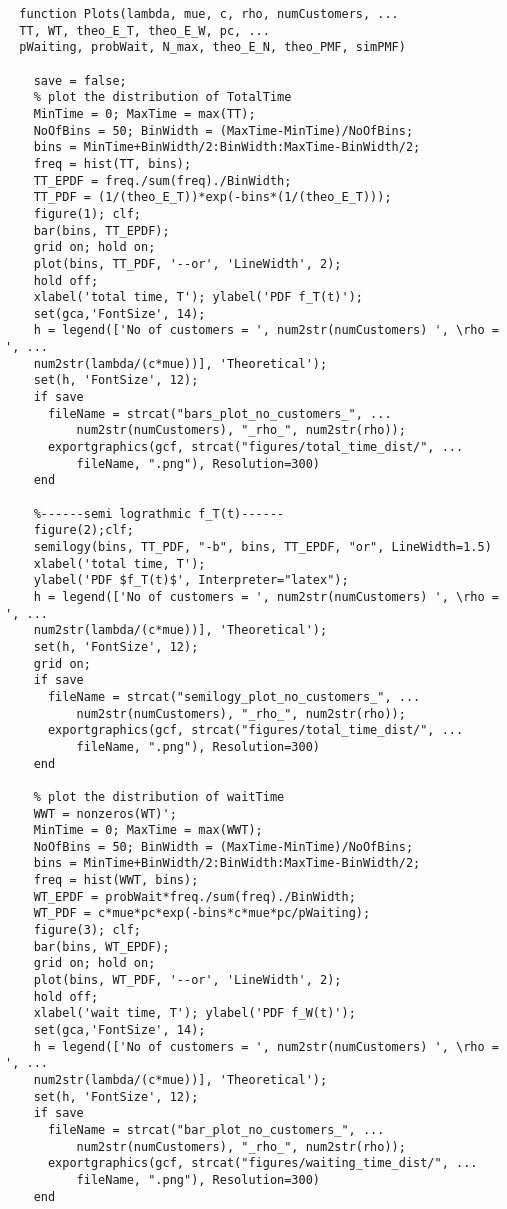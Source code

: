   \begin{lstlisting}[style=Matlab-editor, basicstyle=\ttfamily\footnotesize]
  %-------plot distributions--------
  function Plots(lambda, mue, c, rho, numCustomers, ...
  TT, WT, theo_E_T, theo_E_W, pc, ...
  pWaiting, probWait, N_max, theo_E_N, theo_PMF, simPMF)
  
    save = false;
    % plot the distribution of TotalTime
    MinTime = 0; MaxTime = max(TT); 
    NoOfBins = 50; BinWidth = (MaxTime-MinTime)/NoOfBins;
    bins = MinTime+BinWidth/2:BinWidth:MaxTime-BinWidth/2;
    freq = hist(TT, bins);
    TT_EPDF = freq./sum(freq)./BinWidth;
    TT_PDF = (1/(theo_E_T))*exp(-bins*(1/(theo_E_T)));
    figure(1); clf;
    bar(bins, TT_EPDF); 
    grid on; hold on;
    plot(bins, TT_PDF, '--or', 'LineWidth', 2);
    hold off;
    xlabel('total time, T'); ylabel('PDF f_T(t)');
    set(gca,'FontSize', 14);
    h = legend(['No of customers = ', num2str(numCustomers) ', \rho = ', ...
    num2str(lambda/(c*mue))], 'Theoretical');
    set(h, 'FontSize', 12);
    if save
      fileName = strcat("bars_plot_no_customers_", ...
          num2str(numCustomers), "_rho_", num2str(rho));
      exportgraphics(gcf, strcat("figures/total_time_dist/", ...
          fileName, ".png"), Resolution=300)
    end
  
    %------semi lograthmic f_T(t)------
    figure(2);clf;
    semilogy(bins, TT_PDF, "-b", bins, TT_EPDF, "or", LineWidth=1.5)
    xlabel('total time, T'); 
    ylabel('PDF $f_T(t)$', Interpreter="latex");
    h = legend(['No of customers = ', num2str(numCustomers) ', \rho = ', ...
    num2str(lambda/(c*mue))], 'Theoretical');
    set(h, 'FontSize', 12);
    grid on;
    if save 
      fileName = strcat("semilogy_plot_no_customers_", ...
          num2str(numCustomers), "_rho_", num2str(rho));
      exportgraphics(gcf, strcat("figures/total_time_dist/", ...
          fileName, ".png"), Resolution=300)
    end 
  
    % plot the distribution of waitTime
    WWT = nonzeros(WT)';
    MinTime = 0; MaxTime = max(WWT); 
    NoOfBins = 50; BinWidth = (MaxTime-MinTime)/NoOfBins;
    bins = MinTime+BinWidth/2:BinWidth:MaxTime-BinWidth/2;
    freq = hist(WWT, bins);
    WT_EPDF = probWait*freq./sum(freq)./BinWidth;
    WT_PDF = c*mue*pc*exp(-bins*c*mue*pc/pWaiting);
    figure(3); clf;
    bar(bins, WT_EPDF); 
    grid on; hold on;
    plot(bins, WT_PDF, '--or', 'LineWidth', 2);
    hold off;
    xlabel('wait time, T'); ylabel('PDF f_W(t)');
    set(gca,'FontSize', 14);
    h = legend(['No of customers = ', num2str(numCustomers) ', \rho = ', ...
    num2str(lambda/(c*mue))], 'Theoretical');
    set(h, 'FontSize', 12);
    if save
      fileName = strcat("bar_plot_no_customers_", ...
          num2str(numCustomers), "_rho_", num2str(rho));
      exportgraphics(gcf, strcat("figures/waiting_time_dist/", ...
          fileName, ".png"), Resolution=300)
    end
  

\end{lstlisting}
